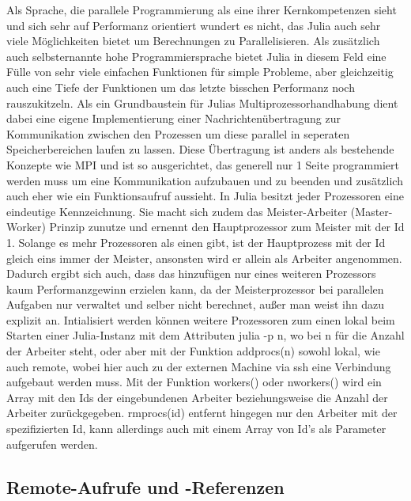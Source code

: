 \documentclass[proseminar,german,utf8]{zihpub}
\begin{document}
Als Sprache, die parallele Programmierung als eine ihrer Kernkompetenzen sieht und sich sehr auf Performanz orientiert wundert es nicht, das Julia auch sehr viele Möglichkeiten bietet um Berechnungen zu Parallelisieren. Als zusätzlich auch selbsternannte hohe Programmiersprache bietet Julia in diesem Feld eine Fülle von sehr viele einfachen Funktionen für simple Probleme, aber gleichzeitig auch eine Tiefe der Funktionen um das letzte bisschen Performanz noch rauszukitzeln. Als ein Grundbaustein für Julias Multiprozessorhandhabung dient dabei eine eigene Implementierung einer Nachrichtenübertragung zur Kommunikation zwischen den Prozessen um diese parallel in seperaten Speicherbereichen laufen zu lassen. Diese Übertragung ist anders als bestehende Konzepte wie MPI und ist so ausgerichtet, das generell nur 1 Seite programmiert werden muss um eine Kommunikation aufzubauen und zu beenden und zusätzlich auch eher wie ein Funktionsaufruf aussieht. In Julia besitzt jeder Prozessoren eine eindeutige Kennzeichnung. Sie macht sich zudem das Meister-Arbeiter (Master-Worker) Prinzip zunutze und ernennt den Hauptprozessor zum Meister mit der Id 1. Solange es mehr Prozessoren als einen gibt, ist der Hauptprozess mit der Id gleich eins immer der Meister, ansonsten wird er allein als Arbeiter angenommen. Dadurch ergibt sich auch, dass das hinzufügen nur eines weiteren Prozessors kaum Performanzgewinn erzielen kann, da der Meisterprozessor bei parallelen Aufgaben nur verwaltet und selber nicht berechnet, außer man weist ihn dazu explizit an. Intialisiert werden können weitere Prozessoren zum einen lokal beim Starten einer Julia-Instanz mit dem Attributen julia -p n, wo bei n für die Anzahl der Arbeiter steht, oder aber mit der Funktion addprocs(n) sowohl lokal, wie auch remote, wobei hier auch zu der externen Machine via ssh eine Verbindung aufgebaut werden muss. Mit der Funktion workers() oder nworkers() wird ein Array mit den Ids der eingebundenen Arbeiter beziehungsweise die Anzahl der Arbeiter zurückgegeben. rmprocs(id) entfernt hingegen nur den Arbeiter mit der spezifizierten Id, kann allerdings auch mit einem Array von Id's als Parameter aufgerufen werden.

\subsection{Remote-Aufrufe und -Referenzen}
\end{document}
